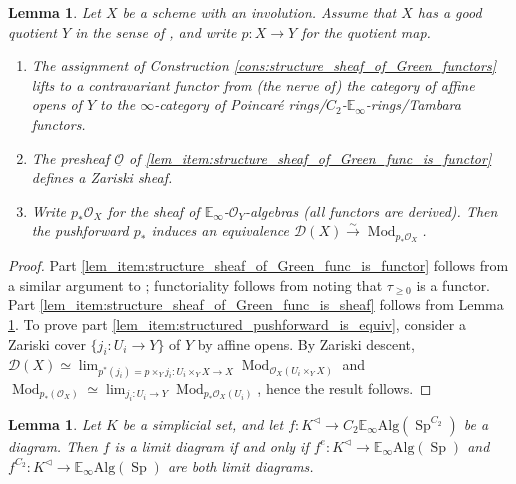 \documentclass{article}
\DeclareMathOperator{\Mod}{Mod} %
\DeclareMathOperator{\Spectra}{Sp} %
\newcommand{\EE}{\mathbb{E}}
\newtheorem{lemma}[equation]{Lemma}
\theoremstyle{definition}
\begin{document}
\begin{lemma} \label{lemma:identify_structure_sheaf_of_Green_func}
Let $ X $ be a scheme with an involution. 
Assume that $ X $ has a \emph{good quotient} $ Y $ in the sense of \cite[Remark 4.20]{azumaya_involution}, and write $ p \colon X \to Y $ for the quotient map. 
\begin{enumerate}[label=(\roman*)]
    \item \label{lem_item:structure_sheaf_of_Green_func_is_functor} The assignment of Construction \ref{cons:structure_sheaf_of_Green_functors} lifts to a contravariant functor from (the nerve of) the category of affine opens of $ Y $ to the $\infty $-category of Poincaré rings/$ C_2 $-$ \EE_\infty $-rings/Tambara functors. 
    \item \label{lem_item:structure_sheaf_of_Green_func_is_sheaf} The presheaf $ \underline{\mathcal{O}} $ of \ref{lem_item:structure_sheaf_of_Green_func_is_functor} defines a Zariski sheaf. 
    \item \label{lem_item:structured_pushforward_is_equiv} Write $ p_* \mathcal{O}_X $ for the sheaf of $ \EE_\infty $-$ \mathcal{O}_Y $-algebras (all functors are derived). 
    Then the pushforward $ p_* $ induces an equivalence $ \mathcal{D}(X) \xrightarrow{\sim} \Mod_{p_*\mathcal{O}_X} $. 
\end{enumerate}
\end{lemma}
\begin{proof}
    Part \ref{lem_item:structure_sheaf_of_Green_func_is_functor} follows from a similar argument to \cite[Theorem 5.1]{LYang_normedrings}; functoriality follows from noting that $ \tau_{\geq 0} $ is a functor.  
    Part \ref{lem_item:structure_sheaf_of_Green_func_is_sheaf} follows from Lemma \ref{lemma:limits_of_param_alg_detected_orbitwise}. 
    To prove part \ref{lem_item:structured_pushforward_is_equiv}, consider a Zariski cover $ \{j_i \colon U_i \to Y \} $ of $ Y $ by affine opens. 
    By Zariski descent, $ \displaystyle\mathcal{D}(X) \simeq \lim_{p^*(j_i) = p \times_Y j_i \colon U_i \times_Y X \to X} \Mod_{\mathcal{O}_X(U_i \times_Y X)} $ and $ \displaystyle\Mod_{p_*(\mathcal{O}_X)} \simeq \lim_{j_i \colon U_i \to Y} \Mod_{p_*\mathcal{O}_X(U_i)} $, hence the result follows. 
\end{proof}
\begin{lemma}\label{lemma:limits_of_param_alg_detected_orbitwise}
    Let $ K $ be a simplicial set, and let $ f \colon K^{\triangleleft} \to C_2 \EE_\infty\mathrm{Alg}(\Spectra^{C_2}) $ be a diagram. 
    Then $ f $ is a limit diagram if and only if $ f^e \colon K^{\triangleleft} \to \EE_\infty\mathrm{Alg}(\Spectra) $ and $ f^{C_2} \colon K^{\triangleleft} \to \EE_\infty\mathrm{Alg}(\Spectra) $ are both limit diagrams. 
\end{lemma}
\end{document}
